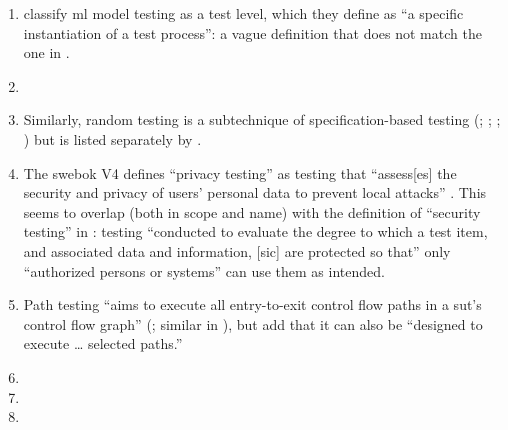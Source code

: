 \begin{enumerate}
    \item %
          \citetISTQB{} classify \acs{ml} model testing as a test level, which
          they define as ``a specific instantiation of a test process'': a vague
          definition that does not match the one in .
    \item %
          \perfSecParFlaw{}
    \item %
          Similarly, random testing is a subtechnique of specification-based
          testing (\citealp[pp.~7, 22]{IEEE2022}; \citeyear[pp.~5, 20, Fig.~2]{IEEE2021c};
          \citealp[p.~5\=/12]{SWEBOK2024}; \citealpISTQB{}) but is listed
          separately by \citet[p.~46]{Firesmith2015}.
    \item %
          The \acs{swebok} V4 defines ``privacy testing'' as testing that
          ``assess[es] the security and privacy of users' personal data to
          prevent local attacks'' \citep[p.~5\=/10]{SWEBOK2024}. This seems to
          overlap (both in scope and name) with the definition of ``security
          testing'' in \citep[p.~7]{IEEE2022}: testing
          ``conducted to evaluate the degree to which a test item, and
          associated data and information, [sic] are protected so that'' only
          ``authorized persons or systems'' can use them as intended.
    \item %
          Path testing ``aims to execute all entry-to-exit control flow paths
          in a \acs{sut}'s control flow graph'' (\citealp[p.~5\=/13]{SWEBOK2024};
          similar in \citealp[p.~119]{Patton2006}), but \citet[p.~316]{IEEE2017}
          add that it can also be ``designed to execute \dots{} selected paths.''
    \item %
          \tourFlaw{}
    \item %
          \alphaFlaw{}
    \item %

\end{enumerate}
